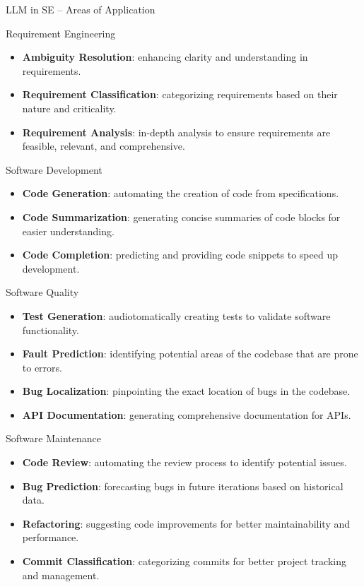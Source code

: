 \documentclass[presentation, 10pt]{beamer}\mode<presentation>{\usetheme{AMSBolognaFC}}
\begin{document}
\begin{frame}[allowframebreaks]{LLM in SE -- Areas of Application}
	\begin{exampleblock}{Requirement Engineering}
			\begin{itemize}
					\item \textbf{Ambiguity Resolution}: enhancing clarity and understanding in requirements.
					\item \textbf{Requirement Classification}: categorizing requirements based on their nature and criticality.
					\item \textbf{Requirement Analysis}: in-depth analysis to ensure requirements are feasible, relevant, and comprehensive.
			\end{itemize}
	\end{exampleblock}
	
	\begin{exampleblock}{Software Development}
			\begin{itemize}
					\item \textbf{Code Generation}: automating the creation of code from specifications.
					\item \textbf{Code Summarization}: generating concise summaries of code blocks for easier understanding.
					\item \textbf{Code Completion}: predicting and providing code snippets to speed up development.
			\end{itemize}
	\end{exampleblock}

	\framebreak

	\begin{exampleblock}{Software Quality}
			\begin{itemize}
					\item \textbf{Test Generation}: audiotomatically creating tests to validate software functionality.
					\item \textbf{Fault Prediction}: identifying potential areas of the codebase that are prone to errors.
					\item \textbf{Bug Localization}: pinpointing the exact location of bugs in the codebase.
					\item \textbf{API Documentation}: generating comprehensive documentation for APIs.
			\end{itemize}
	\end{exampleblock}

	\begin{exampleblock}{Software Maintenance}
			\begin{itemize}
					\item \textbf{Code Review}: automating the review process to identify potential issues.
					\item \textbf{Bug Prediction}: forecasting bugs in future iterations based on historical data.
					\item \textbf{Refactoring}: suggesting code improvements for better maintainability and performance.
					\item \textbf{Commit Classification}: categorizing commits for better project tracking and management.
			\end{itemize}
	\end{exampleblock}
\end{frame}
\end{document}
